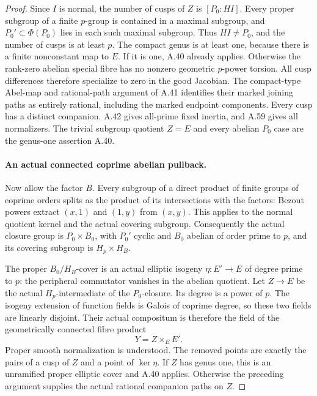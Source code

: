 \begin{proof}
Since \(I\) is normal, the number of cusps of \(Z\)
is \([P_0:HI]\). Every proper subgroup of a finite
\(p\)-group is contained in a maximal subgroup, and
\(P_0'\subset\Phi(P_0)\) lies in each such maximal
subgroup. Thus \(HI\ne P_0\), and the number of
cusps is at least \(p\). The compact genus is at
least one, because there is a finite nonconstant map to
\(E\). If it is one, A.40 already applies.
Otherwise the rank-zero abelian special fibre has no
nonzero geometric \(p\)-power torsion. All cusp differences
therefore specialize to zero in the good Jacobian.
The compact-type Abel-map and rational-path argument of
A.41 identifies their marked joining paths as entirely
rational, including the marked endpoint components.
Every cusp has a distinct companion. A.42 gives all-prime
fixed inertia, and A.59 gives all normalizers. The trivial
subgroup quotient \(Z=E\) and every abelian \(P_0\)
case are the genus-one assertion A.40.

\paragraph{An actual connected coprime abelian pullback.}
Now allow the factor \(B\). Every subgroup of a direct
product of finite groups of coprime orders splits as the
product of its intersections with the factors: Bezout
powers extract \((x,1)\) and \((1,y)\) from \((x,y)\).
This applies to the normal quotient kernel and the actual
covering subgroup. Consequently the actual closure group
is \(P_0\times B_0\), with \(P_0'\) cyclic and
\(B_0\) abelian of order prime to \(p\), and its
covering subgroup is \(H_p\times H_B\).

The proper \(B_0/H_B\)-cover is an actual elliptic
isogeny \(\eta:E'\to E\) of degree prime to \(p\):
the peripheral commutator vanishes in the abelian quotient.
Let \(Z\to E\) be the actual \(H_p\)-intermediate
of the \(P_0\)-closure. Its degree is a power of \(p\).
The isogeny extension of function fields is Galois of
coprime degree, so these two fields are linearly disjoint.
Their actual compositum is therefore the field of the
geometrically connected fibre product
\[
                              Y=Z\times_E E'.           \tag{A.79.3}
\]
Proper smooth normalization is understood. The removed
points are exactly the pairs of a cusp of \(Z\) and
a point of \(\ker\eta\). If \(Z\) has genus one,
this is an unramified proper elliptic cover and A.40
applies. Otherwise the preceding argument supplies the
actual rational companion paths on \(Z\).


\end{proof}
